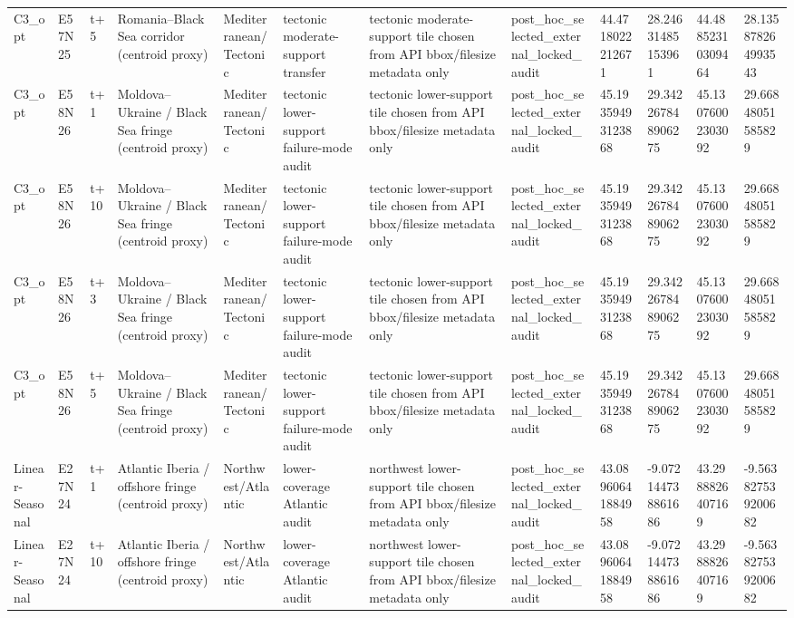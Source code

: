 \begin{landscape}
\begin{longtable}{llllllllllll}
C3\_opt & E57N25 & t+5 & Romania–Black Sea corridor (centroid proxy) & Mediterranean/Tectonic & tectonic moderate-support transfer & tectonic moderate-support tile chosen from API bbox/filesize metadata only & post\_hoc\_selected\_external\_locked\_audit & 44.4718022212671 & 28.24631485153961 & 44.48852310309464 & 28.135878264993543 \\
C3\_opt & E58N26 & t+1 & Moldova–Ukraine / Black Sea fringe (centroid proxy) & Mediterranean/Tectonic & tectonic lower-support failure-mode audit & tectonic lower-support tile chosen from API bbox/filesize metadata only & post\_hoc\_selected\_external\_locked\_audit & 45.19359493123868 & 29.342267848906275 & 45.13076002303092 & 29.66848051585829 \\
C3\_opt & E58N26 & t+10 & Moldova–Ukraine / Black Sea fringe (centroid proxy) & Mediterranean/Tectonic & tectonic lower-support failure-mode audit & tectonic lower-support tile chosen from API bbox/filesize metadata only & post\_hoc\_selected\_external\_locked\_audit & 45.19359493123868 & 29.342267848906275 & 45.13076002303092 & 29.66848051585829 \\
C3\_opt & E58N26 & t+3 & Moldova–Ukraine / Black Sea fringe (centroid proxy) & Mediterranean/Tectonic & tectonic lower-support failure-mode audit & tectonic lower-support tile chosen from API bbox/filesize metadata only & post\_hoc\_selected\_external\_locked\_audit & 45.19359493123868 & 29.342267848906275 & 45.13076002303092 & 29.66848051585829 \\
C3\_opt & E58N26 & t+5 & Moldova–Ukraine / Black Sea fringe (centroid proxy) & Mediterranean/Tectonic & tectonic lower-support failure-mode audit & tectonic lower-support tile chosen from API bbox/filesize metadata only & post\_hoc\_selected\_external\_locked\_audit & 45.19359493123868 & 29.342267848906275 & 45.13076002303092 & 29.66848051585829 \\
Linear-Seasonal & E27N24 & t+1 & Atlantic Iberia / offshore fringe (centroid proxy) & Northwest/Atlantic & lower-coverage Atlantic audit & northwest lower-support tile chosen from API bbox/filesize metadata only & post\_hoc\_selected\_external\_locked\_audit & 43.08960641884958 & -9.072144738861686 & 43.2988826407169 & -9.563827539200682 \\
Linear-Seasonal & E27N24 & t+10 & Atlantic Iberia / offshore fringe (centroid proxy) & Northwest/Atlantic & lower-coverage Atlantic audit & northwest lower-support tile chosen from API bbox/filesize metadata only & post\_hoc\_selected\_external\_locked\_audit & 43.08960641884958 & -9.072144738861686 & 43.2988826407169 & -9.563827539200682 \\

\end{longtable}
\end{landscape}
